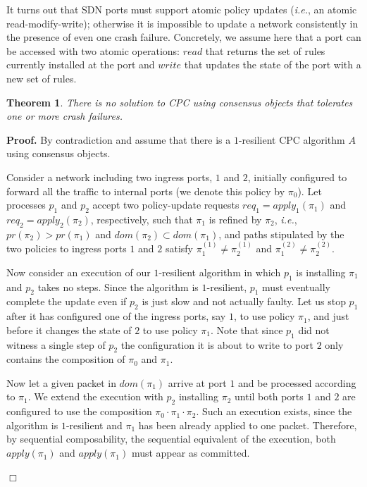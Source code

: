 \documentclass[11pt,pdftex,letter]{article}
\newcommand{\dom}{\textit{dom}}
\newcommand{\pr}{\textit{pr}}
\newcommand{\ie}{{\it i.e.}}
\newcommand{\ssnote}[1]{\textcolor{heraldBlue}{\small \bf [SS: #1]}}
\newcommand{\ssnote}[1]{}
\newtheorem{theorem}{Theorem}
\newenvironment{proof}[1][Proof]{\noindent\textbf{#1.} }{\hfill $\Box$\\[2mm]}
\begin{document}
\begin{appendix}
It turns out that SDN ports must support atomic policy updates (\ie, an atomic read-modify-write);
otherwise it is impossible to update a network consistently in the presence of even one crash failure.
Concretely, we assume here that a port can be accessed with two atomic
operations: $\textit{read}$ that returns the set
  of rules currently installed at the port and $\textit{write}$ that
  updates the state of the port with a new set of rules.
%

\begin{theorem}\label{thm:impossible}
There is no solution to CPC using consensus objects that tolerates one or more crash failures.
\end{theorem}
\begin{proof}
By contradiction and assume that there is a $1$-resilient CPC
algorithm $A$ using consensus objects.

Consider a network including two ingress ports, $1$ and $2$, initially
configured to forward all the traffic to internal ports (we denote this policy by $\pi_0$).
Let processes $p_1$ and $p_2$ accept two policy-update requests $\textit{req}_1=\textit{apply}_1(\pi_1)$
and $\textit{req}_2=\textit{apply}_2(\pi_2)$, respectively, such that
$\pi_1$ is refined by $\pi_2$, \ie, $\pr(\pi_2)>\pr(\pi_1)$ and $\dom(\pi_2)\subset\dom(\pi_1)$,
and paths stipulated by the two policies to ingress ports $1$ and $2$
satisfy $\pi_1^{(1)}\neq \pi_2^{(1)}$ and $\pi_1^{(2)}\neq \pi_2^{(2)}$.

Now consider an execution of our $1$-resilient algorithm in which
$p_1$ is installing $\pi_1$ and $p_2$ takes no steps. Since the
algorithm is $1$-resilient, $p_1$ must eventually complete the
update even if $p_2$ is just slow and not actually faulty. Let us stop
$p_1$ after it has configured one of the ingress ports, say $1$, to
use policy $\pi_1$, and just before it changes the state of $2$ to use
policy $\pi_1$. Note that since $p_1$ did not witness a single step of
$p_2$ the configuration it is about to write to port $2$ only contains
the composition of $\pi_0$ and $\pi_1$.

Now let a given packet in $\dom(\pi_1)$ arrive at port $1$ and be
processed according to $\pi_1$.
We extend the execution with $p_2$ installing $\pi_2$ until both ports $1$
and $2$ are configured to use the composition
$\pi_0\cdot\pi_1\cdot\pi_2$. Such an execution exists, since the
algorithm is $1$-resilient and $\pi_1$ has been already applied to one
packet.
Therefore, by sequential composability,  the sequential equivalent of
the execution, both $\textit{apply}(\pi_1)$ and
$\textit{apply}(\pi_1)$
must appear as committed.


\end{proof}
\end{appendix}
\end{document}
